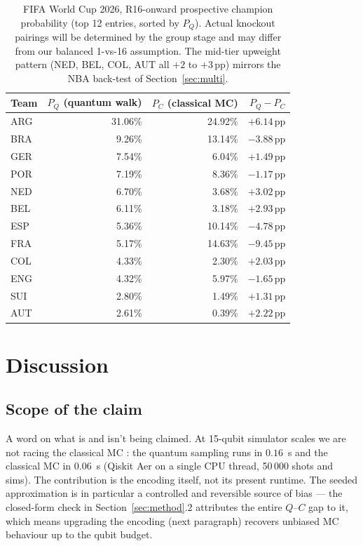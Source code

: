 \documentclass[11pt]{article}
\begin{document}
\begin{table}[!htbp]
\centering
\caption{FIFA World Cup 2026, R16-onward prospective champion
probability (top 12 entries, sorted by $P_Q$). Actual knockout pairings
will be determined by the group stage and may differ from our balanced
1-vs-16 assumption. The mid-tier upweight pattern (NED, BEL, COL, AUT
all $+2$ to $+3$\,pp) mirrors the NBA back-test of
Section~\ref{sec:multi}.}
\label{tab:wc}
\begin{tabular}{lrrr}
\toprule
Team & $P_Q$ (quantum walk) & $P_C$ (classical MC) & $P_Q - P_C$ \\
\midrule
ARG & 31.06\% & 24.92\% & $+6.14$\,pp \\
BRA & 9.26\% & 13.14\% & $-3.88$\,pp \\
GER & 7.54\% & 6.04\% & $+1.49$\,pp \\
POR & 7.19\% & 8.36\% & $-1.17$\,pp \\
NED & 6.70\% & 3.68\% & $+3.02$\,pp \\
BEL & 6.11\% & 3.18\% & $+2.93$\,pp \\
ESP & 5.36\% & 10.14\% & $-4.78$\,pp \\
FRA & 5.17\% & 14.63\% & $-9.45$\,pp \\
COL & 4.33\% & 2.30\% & $+2.03$\,pp \\
ENG & 4.32\% & 5.97\% & $-1.65$\,pp \\
SUI & 2.80\% & 1.49\% & $+1.31$\,pp \\
AUT & 2.61\% & 0.39\% & $+2.22$\,pp \\
\bottomrule
\end{tabular}
\end{table}

\section{Discussion}
\label{sec:discussion}

\subsection{Scope of the claim}

A word on what is and isn't being claimed. At 15-qubit simulator
scales we are not racing the classical MC : the
quantum sampling runs in $0.16$~s and the classical MC in $0.06$~s
(Qiskit Aer on a single CPU thread, 50\,000 shots and sims). The
contribution is the encoding itself, not its present runtime. The
seeded approximation is in particular a controlled and reversible
source of bias --- the closed-form check in
Section~\ref{sec:method}.2 attributes the entire $Q$--$C$ gap to it,
which means upgrading the encoding (next paragraph) recovers
unbiased MC behaviour up to the qubit budget.
\end{document}
